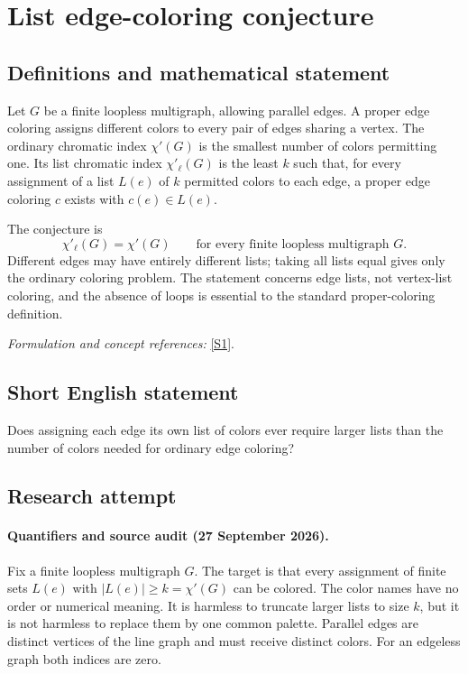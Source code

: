 \documentclass[11pt]{article}
\begin{document}
\section*{\texorpdfstring{List edge-coloring conjecture}{List edge-coloring conjecture}}\label{statement}
\subsection{Definitions and mathematical statement}
Let $G$ be a finite loopless multigraph, allowing parallel edges. A proper edge coloring assigns different colors to every pair of edges sharing a vertex. The ordinary chromatic index $\chi'(G)$ is the smallest number of colors permitting one. Its list chromatic index $\chi'_\ell(G)$ is the least $k$ such that, for every assignment of a list $L(e)$ of $k$ permitted colors to each edge, a proper edge coloring $c$ exists with $c(e)\in L(e)$.

The conjecture is
\[
 \chi'_\ell(G)=\chi'(G)\qquad\text{for every finite loopless multigraph }G.
\]
Different edges may have entirely different lists; taking all lists equal gives only the ordinary coloring problem. The statement concerns edge lists, not vertex-list coloring, and the absence of loops is essential to the standard proper-coloring definition.
\par\smallskip\textit{Formulation and concept references:} \href{https://www.sciencedirect.com/science/article/pii/S0012365X25000287}{[S1]}.

\subsection{Short English statement}
Does assigning each edge its own list of colors ever require larger lists than the number of colors needed for ordinary edge coloring?
\subsection{Research attempt}

\paragraph{Quantifiers and source audit (27 September 2026).}
Fix a finite loopless multigraph $G$. The target is that every assignment of
finite sets $L(e)$ with $|L(e)|\geq k=\chi'(G)$ can be colored. The color
names have no order or numerical meaning. It is harmless to truncate larger
lists to size $k$, but it is not harmless to replace them by one common
palette. Parallel edges are distinct vertices of the line graph and must
receive distinct colors. For an edgeless graph both indices are zero.
\end{document}
